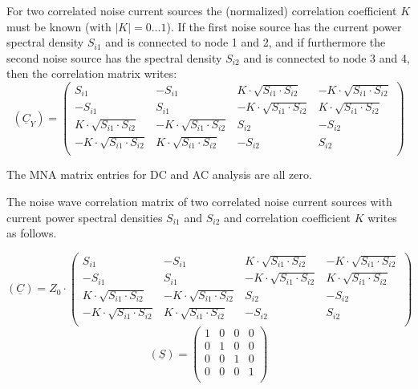 For two correlated noise current sources the (normalized) correlation
coefficient $K$ must be known (with $|K|=0\dots 1$). If the first
noise source has the current power spectral
density $S_{i1}$ and is connected to node 1 and 2, and if furthermore
the second noise source has the spectral density $S_{i2}$ and is connected
to node 3 and 4, then the correlation matrix writes:
\begin{equation}
(\underline{C}_Y) =
\begin{pmatrix}
 S_{i1} & -S_{i1} &  K\cdot\sqrt{S_{i1}\cdot S_{i2}} & -K\cdot\sqrt{S_{i1}\cdot S_{i2}} \\
-S_{i1} &  S_{i1} & -K\cdot\sqrt{S_{i1}\cdot S_{i2}} &  K\cdot\sqrt{S_{i1}\cdot S_{i2}} \\
 K\cdot\sqrt{S_{i1}\cdot S_{i2}} & -K\cdot\sqrt{S_{i1}\cdot S_{i2}} &  S_{i2} & -S_{i2} \\
-K\cdot\sqrt{S_{i1}\cdot S_{i2}} &  K\cdot\sqrt{S_{i1}\cdot S_{i2}} & -S_{i2} &  S_{i2} \\
\end{pmatrix}
\end{equation}

The MNA matrix entries for DC and AC analysis are all zero.

\addvspace{12pt}

The noise wave correlation matrix of two correlated noise current
sources with current power spectral densities $S_{i1}$ and $S_{i2}$
and correlation coefficient $K$ writes as follows.

\begin{equation}
(\underline{C}) = Z_0\cdot
\begin{pmatrix}
 S_{i1} & -S_{i1} &  K\cdot\sqrt{S_{i1}\cdot S_{i2}} & -K\cdot\sqrt{S_{i1}\cdot S_{i2}} \\
-S_{i1} &  S_{i1} & -K\cdot\sqrt{S_{i1}\cdot S_{i2}} &  K\cdot\sqrt{S_{i1}\cdot S_{i2}} \\
 K\cdot\sqrt{S_{i1}\cdot S_{i2}} & -K\cdot\sqrt{S_{i1}\cdot S_{i2}} &  S_{i2} & -S_{i2} \\
-K\cdot\sqrt{S_{i1}\cdot S_{i2}} &  K\cdot\sqrt{S_{i1}\cdot S_{i2}} & -S_{i2} &  S_{i2} \\
\end{pmatrix}
\end{equation}
\begin{equation}
(\underline{S}) =
\begin{pmatrix}
 1 & 0 & 0 & 0 \\
 0 & 1 & 0 & 0 \\
 0 & 0 & 1 & 0 \\
 0 & 0 & 0 & 1 \\
\end{pmatrix}
\end{equation}

